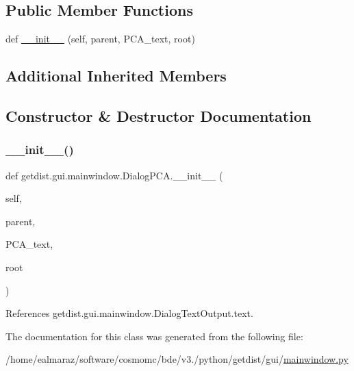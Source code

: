\subsection*{Public Member Functions}
\begin{DoxyCompactItemize}
\item 
def \mbox{\hyperlink{classgetdist_1_1gui_1_1mainwindow_1_1DialogPCA_ac1e36dc51ccb836e0e770dc49e494082}{\+\_\+\+\_\+init\+\_\+\+\_\+}} (self, parent, P\+C\+A\+\_\+text, root)
\end{DoxyCompactItemize}
\subsection*{Additional Inherited Members}


\subsection{Constructor \& Destructor Documentation}
\mbox{\label{classgetdist_1_1gui_1_1mainwindow_1_1DialogPCA_ac1e36dc51ccb836e0e770dc49e494082}} 
\subsubsection{\texorpdfstring{\+\_\+\+\_\+init\+\_\+\+\_\+()}{\_\_init\_\_()}}
{\footnotesize\ttfamily def getdist.\+gui.\+mainwindow.\+Dialog\+P\+C\+A.\+\_\+\+\_\+init\+\_\+\+\_\+ (\begin{DoxyParamCaption}\item[{}]{self,  }\item[{}]{parent,  }\item[{}]{P\+C\+A\+\_\+text,  }\item[{}]{root }\end{DoxyParamCaption})}



References getdist.\+gui.\+mainwindow.\+Dialog\+Text\+Output.\+text.



The documentation for this class was generated from the following file\+:\begin{DoxyCompactItemize}
\item 
/home/ealmaraz/software/cosmomc/bde/v3./python/getdist/gui/\mbox{\hyperlink{mainwindow_8py}{mainwindow.\+py}}\end{DoxyCompactItemize}
